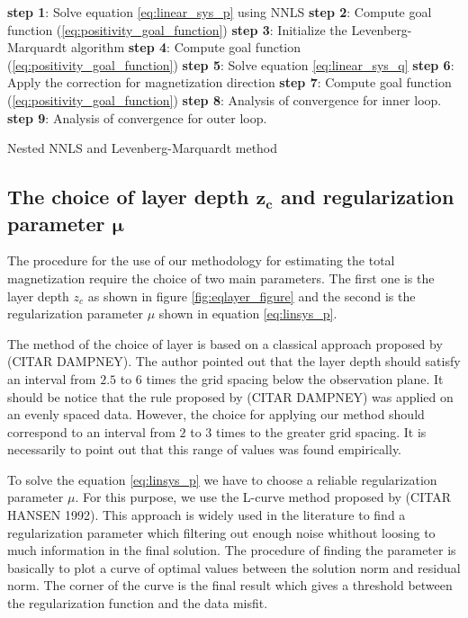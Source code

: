 \begin{algorithm}[H]
	
	{ \textbf{step 1}: Solve equation \ref{eq:linear_sys_p} using NNLS \;
	  \textbf{step 2}: Compute goal function (\ref{eq:positivity_goal_function}) \; 
		{ \textbf{step 3}:  Initialize the Levenberg-Marquardt algorithm \;  
		  \textbf{step 4}: Compute goal function (\ref{eq:positivity_goal_function})\;
			 {
				\textbf{step 5}:  Solve equation \ref{eq:linear_sys_q} \;
				\textbf{step 6}:  Apply the correction for magnetization direction \;
				\textbf{step 7}: Compute goal function (\ref{eq:positivity_goal_function})\;
			}
			\textbf{step 8}:  Analysis of convergence for inner loop.}
			\textbf{step 9}:  Analysis of convergence for outer loop.}
		
		\caption{Nested NNLS and Levenberg-Marquardt method}
		\label{cd: LM_NNLS}
	\end{algorithm}

\subsection{The choice of layer depth $\mathbf{z_c}$ and regularization parameter $\mathbf{\mu}$}

The procedure for the use of our methodology for estimating the total magnetization require the choice of two main parameters. The first one is the layer depth $z_c$ as shown in figure \ref{fig:eqlayer_figure} and the second is the regularization parameter $\mu$ shown in equation \ref{eq:linsys_p}.

The method of the choice of layer is based on a classical approach proposed by (CITAR DAMPNEY). The author pointed out that the layer depth should satisfy an interval from $2.5$ to $6$ times the grid spacing below the observation plane. It should be notice that the rule proposed by (CITAR DAMPNEY) was applied on an evenly spaced data. However, the choice for applying our method should correspond to an interval from $2$ to $3$ times to the greater grid spacing. It is necessarily to point out that this range of values was found empirically.

To solve the equation \ref{eq:linsys_p} we have to choose a reliable regularization parameter $\mu$. For this purpose, we use the L-curve method proposed by (CITAR HANSEN 1992). This approach is widely used in the literature to find a regularization parameter which filtering out enough noise whithout loosing to much information in the final solution. The procedure of finding the parameter is basically to plot a curve of optimal values between the solution norm and residual norm. The corner of the curve is the final result which gives a threshold between the regularization function and the data misfit.
